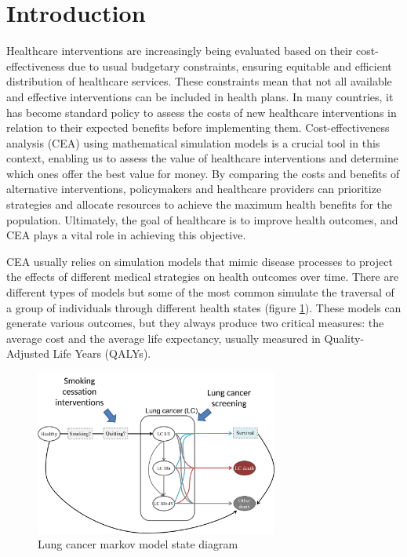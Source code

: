 \documentclass{IOS-Book-Article}
\def\hb{\hbox to 11.5 cm{}}
\begin{document}
	\markboth{April 2023\hb}{April 2023\hb}
	
	\section{Introduction}
	Healthcare interventions are increasingly being evaluated based on their cost-effectiveness due to usual budgetary constraints, ensuring equitable and efficient distribution of healthcare services. These constraints mean that not all available and effective interventions can be included in health plans. In many countries, it has become standard policy to assess the costs of new healthcare interventions in relation to their expected benefits before implementing them. Cost-effectiveness analysis (CEA) using mathematical simulation models is a crucial tool in this context, enabling us to assess the value of healthcare interventions and determine which ones offer the best value for money\cite{drummond}. By comparing the costs and benefits of alternative interventions, policymakers and healthcare providers can prioritize strategies and allocate resources to achieve the maximum health benefits for the population. Ultimately, the goal of healthcare is to improve health outcomes, and CEA plays a vital role in achieving this objective\cite{levin}.
	
	CEA usually relies on simulation models that mimic disease processes to project the effects of different medical strategies on health outcomes over time\cite{applied_he}. There are different types of models but some of the most common simulate the traversal of a group of individuals through different health states (figure \ref{fig:lung_model}). These models can generate various outcomes, but they always produce two critical measures: the average cost and the average life expectancy, usually measured in Quality-Adjusted Life Years (QALYs)\cite{qalys}.
	
	\begin{figure}[h!]
		\centering	
		\includegraphics[width=80mm]{figs/lungmodel.pdf}		
		\caption{Lung cancer markov model state diagram}	
		\label{fig:lung_model}	
	\end{figure}
	
\end{document}
